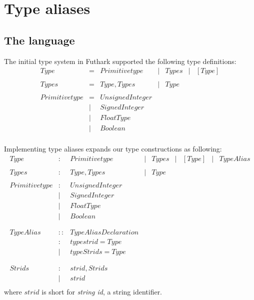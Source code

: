 \section{Type aliases}
\subsection{The language}
The initial type system in Futhark supported the following type definitions:
\begin{align*}
  Type           & = & Primitive type
                 & | & { Types }
                 & | & [ Type ]
  \\
  \\
  Types          & = & Type , Types
                 & | & Type
  \\
  \\
  Primitive type & = & UnsignedInteger \\
                 & | & SignedInteger \\
                 & | & FloatType \\
                 & | & Boolean \\
\end{align*}

Implementing type aliases expands our type constructions as following:
\begin{align*}
  Type           & : & Primitive type
                 & | & { Types }
                 & | & [ Type ]
                 & | & TypeAlias
  \\
  \\
  Types          & : & Type , Types
                 & | & Type
  \\
  \\
  Primitive type & : & UnsignedInteger \\
                 & | & SignedInteger \\
                 & | & FloatType \\
                 & | & Boolean \\
  \\
  \\
  TypeAlias      & :: & { TypeAliasDeclaration } \\
                 & :  & type strid = Type \\
                 & |  & type Strids = Type \\
  \\
  \\
  Strids         & :  & strid , Strids \\
                 & |  & strid \\
\end{align*}
where $strid$ is short for \textit{string id}, a string identifier.

